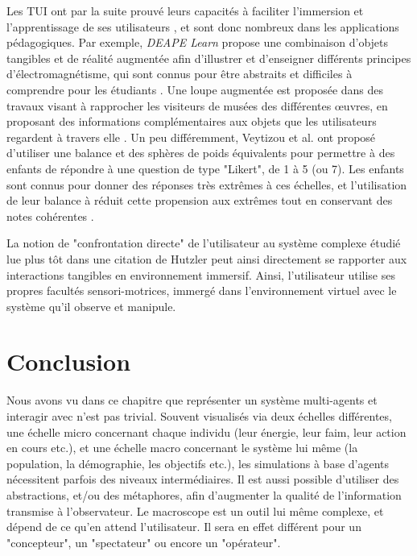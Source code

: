 			Les TUI ont par la suite prouvé leurs capacités à faciliter l'immersion et l'apprentissage de ses utilisateurs \cite{zuckerman_tui_2013, fleck_marker-based_2015, cheng_affordances_2013}, et sont donc nombreux dans les applications pédagogiques. Par exemple, \textit{DEAPE Learn} propose une combinaison d'objets tangibles et de réalité augmentée afin d'illustrer et d'enseigner différents principes d'électromagnétisme, qui sont connus pour être abstraits et difficiles à comprendre pour les étudiants \cite{da_costa_realite_2019}. Une loupe augmentée est proposée dans des travaux visant à rapprocher les visiteurs de musées des différentes œuvres, en proposant des informations complémentaires aux objets que les utilisateurs regardent à travers elle  \cite{damala_loupe_2016}. Un peu différemment, Veytizou et al. ont proposé d'utiliser une balance et des sphères de poids équivalents pour permettre à des enfants de répondre à une question de type "Likert", de 1 à 5 (ou 7). Les enfants sont connus pour donner des réponses très extrêmes à ces échelles, et l'utilisation de leur balance à réduit cette propension aux extrêmes tout en conservant des notes cohérentes \cite{veytizou_could_2018}.
	
	La notion de "confrontation directe" de l'utilisateur au système complexe étudié lue plus tôt dans une citation de Hutzler \cite{hutzler_du_2000} peut ainsi directement se rapporter aux interactions tangibles en environnement immersif. Ainsi, l'utilisateur utilise ses propres facultés sensori-motrices, immergé dans l'environnement virtuel avec le système qu'il observe et manipule.
	
				
	\section*{Conclusion}
	
		Nous avons vu dans ce chapitre que représenter un système multi-agents et interagir avec n'est pas trivial. Souvent visualisés via deux échelles différentes, une échelle micro concernant chaque individu (leur énergie, leur faim, leur action en cours etc.), et une échelle macro concernant le système lui même (la population, la démographie, les objectifs etc.), les simulations à base d'agents nécessitent parfois des niveaux intermédiaires. Il est aussi possible d'utiliser des abstractions, et/ou des métaphores, afin d'augmenter la qualité de l'information transmise à l'observateur. Le macroscope est un outil lui même complexe, et dépend de ce qu'en attend l'utilisateur. Il sera en effet différent pour un "concepteur", un "spectateur" ou encore un "opérateur".
		

